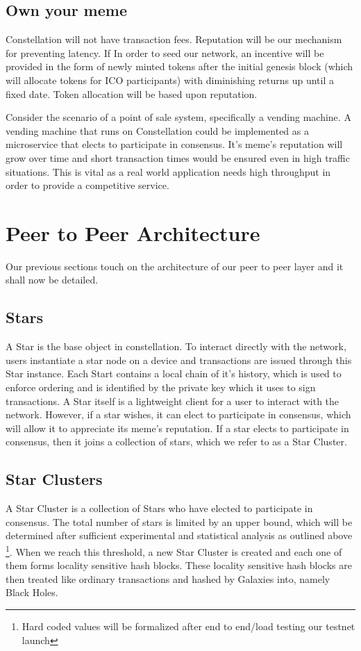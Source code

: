 \documentclass{article}
\begin{document}
\subsection{Own your meme}
Constellation will not have transaction fees. Reputation will be our mechanism for preventing latency. If In order to seed our network, an incentive will be provided in the form of newly minted tokens after the initial genesis block (which will allocate tokens for ICO participants) with diminishing returns up until a fixed date. Token allocation will be based upon reputation. 

Consider the scenario of a point of sale system, specifically a vending machine. A vending machine that runs on Constellation could be implemented as a microservice that elects to participate in consensus. It's meme's reputation will grow over time and short transaction times would be ensured even in high traffic situations. This is vital as a real world application needs high throughput in order to provide a competitive service.

\section{Peer to Peer Architecture}
Our previous sections touch on the architecture of our peer to peer layer and it shall now be detailed. 

\subsection{Stars}
A Star is the base object in constellation. To interact directly with the network, users instantiate a star node on a device and transactions are issued through this Star instance. Each Start contains a local chain of it's history, which is used to enforce ordering and is identified by the private key which it uses to sign transactions. A Star itself is a lightweight client for a user to interact with the network. However, if a star wishes, it can elect to participate in consensus, which will allow it to appreciate its meme's reputation. If a star elects to participate in consensus, then it joins a collection of stars, which we refer to as a Star Cluster.

\subsection{Star Clusters}
A Star Cluster is a collection of Stars who have elected to participate in consensus. The total number of stars is limited by an upper bound, which will be determined after sufficient experimental and statistical analysis as outlined above \footnote{Hard coded values will be formalized after end to end/load testing our testnet launch}. When we reach this threshold, a new Star Cluster is created and each one of them forms locality sensitive hash blocks. These locality sensitive hash blocks are then treated like ordinary transactions and hashed by Galaxies into, namely Black Holes.
\end{document}
